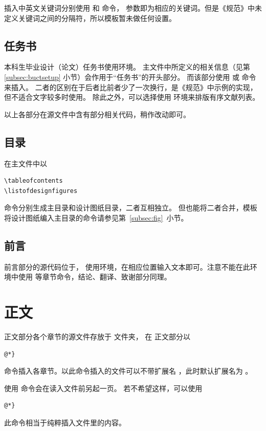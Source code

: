 插入中英文关键词分别使用  和 命令，
参数即为相应的关键词。但是《规范》中未定义关键词之间的分隔符，所以模板暂未做任何设置。

\subsection{任务书}\label{subsec:taskbook}
本科生毕业设计（论文）任务书使用环境。
主文件中所定义的相关信息（见第 \ref{subsec:buctsetup} 小节）会作用于“任务书”的开头部分。
而该部分使用  或  命令来插入。
二者的区别在于后者比前者少了一次换行，是《规范》中示例的实现，但不适合文字较多时使用。
除此之外，可以选择使用  环境来排版有序文献列表。

以上各部分在源文件中含有部分相关代码，稍作改动即可。

\subsection{目录}\label{subsec:content}
在主文件中以
\begin{lstlisting}[numbers=none]
\tableofcontents
\listofdesignfigures
\end{lstlisting}
命令分别生成主目录和设计图纸目录，二者互相独立。
但也能将二者合并，模板将设计图纸编入主目录的命令请参见第~\ref{subsec:fig}~小节。


\subsection{前言}\label{subsec:foreword}
前言部分的源代码位于，
使用环境，在相应位置输入文本即可。注意不能在此环境中使用
等章节命令，结论、翻译、致谢部分同理。

\section{正文}
正文部分各个章节的源文件存放于  文件夹，
在  正文部分以

\begin{lstlisting}[numbers=none]
@*}
	\end{lstlisting}
命令插入各章节。以此命令插入的文件可以不带扩展名
，此时默认扩展名为 。

使用  命令会在读入文件前另起一页。
若不希望这样，可以使用
\begin{lstlisting}[numbers=none]
@*}
	\end{lstlisting}
此命令相当于纯粹插入文件里的内容。

